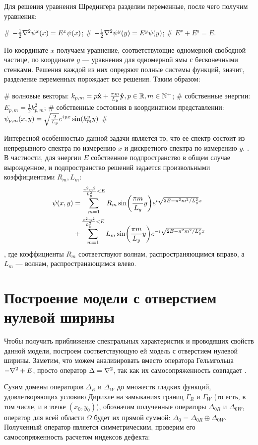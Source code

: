 Для решения уравнения Шредингера разделим переменные, после чего получим уравнения:
\begin{ilist}
# $-\frac{1}{2} \laplacian \psi^x(x) = E^x \psi(x)$;
# $-\frac{1}{2} \laplacian \psi^y(y) = E^y \psi(y)$;
# $E^x + E^y = E$.
\end{ilist}
По координате $x$ получаем уравнение, соответствующие одномерной свободной частице, по координате $y$ — уравнения для одномерной ямы с бесконечными стенками. Решения каждой из них опредяют полные системы функций, значит, разделение переменных порождает все решения. Таким образом:
\begin{ilist}
# волновые векторы: $k_{p, m} = p \vb{\hat{x}} + \frac{\pi m}{L_y} \vb{\hat{y}}, p \in \mathbb{R}, m \in \mathbb{N}^+$;
# собственные энергии: $E_{p, m} = \frac{1}{2} k_{p, m}^2$;
# собственные состояния в координатном представлении: $\psi_{p, m}(x, y) = \sqrt{\frac{2}{L_y}} e^{{i\mkern1mu} p x} \sin(k^y_m y)$
# 
\end{ilist}
Интересной особенностью данной задачи является то, что ее спектр состоит из непрерывного спектра по измерению $x$ и дискретного спектра по измерению $y$. . В частности, для энергии $E$ собственное подпространство в общем случае вырожденное, и подпространство решений задается произвольными коэффициентами $R_m, L_m$:
\begin{align*}
\psi(x, y)
& = \sum\limits_{m = 1}^{\frac{\pi^2 m^2}{L_y^2} < E} R_m \sin(\frac{\pi m}{L_y} y) e^{{i\mkern1mu} \sqrt{2 E - \pi^2 m^2 / L_y^2} x} \\
& + \sum\limits_{m = 1}^{\frac{\pi^2 m^2}{L_y^2} < E} L_m \sin(\frac{\pi m}{L_y} y) e^{-{i\mkern1mu} \sqrt{2 E - \pi^2 m^2 / L_y^2} x}
\end{align*}
, где коэффициенты $R_m$ соответствуют волнам, распространяющимся вправо, а $L_m$ — волнам, распространающимся влево. 

\section{Построение модели с отверстием нулевой ширины}
Чтобы получить приближение спектральных характеристик и проводящих свойств данной модели, построем соответствующую ей модель с отверстием нулевой ширины. Заметим, что можем анализировать вместо оператора Гельмгольца $-\laplacian + E$, просто оператор $\Delta = \laplacian$, так как их самосопряженность совпадает .

Сузим домены операторов $\Delta_R$ и $\Delta_W$ до множеств гладких функций, удовлетворяющих условию Дирихле на замыканиях границ $\Gamma_R$ и $\Gamma_W$ (то есть, в том числе, и в точке $(x_0, y_0)$), обозначим полученные операторы $\Delta_{0R}$ и $\Delta_{0W}$, оператор для всей области $\Omega$ будет их прямой суммой: $\Delta_0 = \Delta_{0R} \oplus \Delta_{0W}$. Полученный оператор является симметрическим, проверим его самосопряженность расчетом индексов дефекта:


